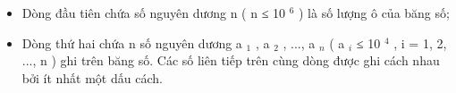 \begin{itemize}
	\item Dòng đầu tiên chứa số nguyên dương n ( n ≤ 10 $^ 6 $ ) là số lượng ô của băng số;
	\item Dòng thứ hai chứa n số nguyên dương a $_ 1 $ , a $_ 2 $ , ..., a $_ n $ ( a $_ i $ ≤ 10 $^ 4 $ , i = 1, 2, ..., n ) ghi trên băng số. Các số liên tiếp trên cùng dòng được ghi cách nhau bởi ít nhất một dấu cách.
\end{itemize}

\